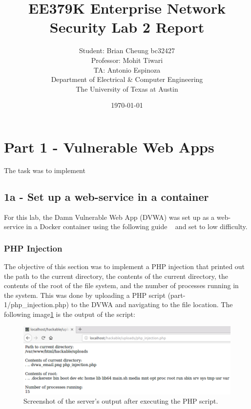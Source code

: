 \documentclass[11pt]{article}
\author{Student: Brian Cheung bc32427 \\ Professor: Mohit Tiwari \\ TA: Antonio Espinoza \\ Department of Electrical \& Computer Engineering \\ The University of Texas at Austin}
\date{\today}
\title{EE379K Enterprise Network Security Lab 2 Report}
\begin{document}
\maketitle
\newpage
\section*{Part 1 - Vulnerable Web Apps}
\label{sec:part-1}
The task was to implement
\subsection*{1a - Set up a web-service in a container}
For this lab, the Damn Vulnerable Web App (DVWA) was set up as a web-service in a Docker container
using the following guide ~\cite{dvwa} and set to low difficulty.

\subsubsection*{PHP Injection}
The objective of this section was to implement a PHP injection that printed out the path to the current directory,
the contents of the current directory, the contents of the root of the file system, and the number of processes running in the system.
This was done by uploading a PHP script (part-1/php\_injection.php) to the DVWA and navigating to the file location.
The following image\ref{fig:php-injection} is the output of the script:
\begin{figure}[htbp]
  \centering
  \includegraphics[width=.9\linewidth]{./php-injection.png}
  \caption{\label{fig:php-injection}
  Screenshot of the server's output after executing the PHP script.}
\end{figure}
\end{document}

